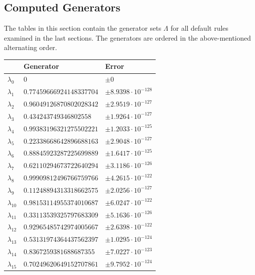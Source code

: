 \documentclass[a4paper,10pt]{article}
\begin{document}
\begin{appendix}
\section{Computed Generators}

The tables in this section contain the generator sets $\Lambda$ for all default
rules examined in the last sections. The generators are ordered in the above-mentioned
alternating order.

\begin{table}
  \centering
  \begin{tabular}{|l|ll|}
  \hline
  {}             & Generator                 & Error \\
  \hline
  $\lambda_{0}$  & $0$                       &  $\pm 0$ \\
  $\lambda_{1}$  & $0.77459666924148337704$  &  $\pm 8.9398 \cdot 10^{-128}$ \\
  $\lambda_{2}$  & $0.96049126870802028342$  &  $\pm 2.9519 \cdot 10^{-127}$ \\
  $\lambda_{3}$  & $0.434243749346802558$    &  $\pm 1.9264 \cdot 10^{-127}$ \\
  $\lambda_{4}$  & $0.99383196321275502221$  &  $\pm 1.2033 \cdot 10^{-125}$ \\
  $\lambda_{5}$  & $0.22338668642896688163$  &  $\pm 2.9048 \cdot 10^{-127}$ \\
  $\lambda_{6}$  & $0.88845923287225699889$  &  $\pm 1.6417 \cdot 10^{-125}$ \\
  $\lambda_{7}$  & $0.62110294673722640294$  &  $\pm 3.1186 \cdot 10^{-126}$ \\
  $\lambda_{8}$  & $0.99909812496766759766$  &  $\pm 4.2615 \cdot 10^{-122}$ \\
  $\lambda_{9}$  & $0.11248894313318662575$  &  $\pm 2.0256 \cdot 10^{-127}$ \\
  $\lambda_{10}$ & $0.98153114955374010687$  &  $\pm 6.0247 \cdot 10^{-122}$ \\
  $\lambda_{11}$ & $0.33113539325797683309$  &  $\pm 5.1636 \cdot 10^{-126}$ \\
  $\lambda_{12}$ & $0.92965485742974005667$  &  $\pm 2.6398 \cdot 10^{-122}$ \\
  $\lambda_{13}$ & $0.53131974364437562397$  &  $\pm 1.0295 \cdot 10^{-124}$ \\
  $\lambda_{14}$ & $0.8367259381688687355$   &  $\pm 7.0227 \cdot 10^{-123}$ \\
  $\lambda_{15}$ & $0.70249620649152707861$  &  $\pm 9.7952 \cdot 10^{-124}$ \\

\end{tabular}
\end{table}
\end{appendix}
\end{document}
